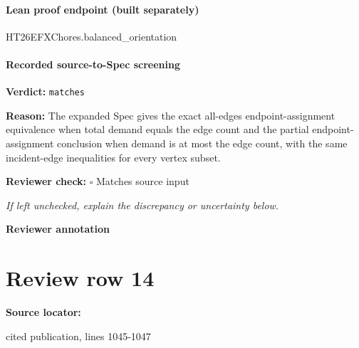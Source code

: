 \documentclass[10pt]{article}
\newcommand{\reviewerbox}{%
  \par\noindent\fbox{\parbox{0.96\linewidth}{\rule{0pt}{0.38in}}}\par
}
\newcommand{\reviewmatch}[1]{%
  \par\noindent\textbf{Reviewer check:} $\square$\; #1\par
  \noindent\emph{If left unchecked, explain the discrepancy or uncertainty below.}\par
}
\begin{document}
\paragraph{Lean proof endpoint (built separately)}\begin{ReviewVerbatim}
HT26EFXChores.balanced_orientation
\end{ReviewVerbatim}

\paragraph{Recorded source-to-Spec screening}
\textbf{Verdict:} \texttt{matches}
\\
{\raggedright
\textbf{Reason:} The expanded Spec gives the exact all-\allowbreak{}edges endpoint-\allowbreak{}assignment equivalence when total demand equals the edge count and the partial endpoint-\allowbreak{}assignment conclusion when demand is at most the edge count, with the same incident-\allowbreak{}edge inequalities for every vertex subset.\allowbreak{}
\par}
\reviewmatch{Matches source input}
\noindent\textbf{Reviewer annotation}\par
\reviewerbox
\clearpage
\hypertarget{source-claim-6263bf063357fb29}{}
\section*{Review row 14}
\textbf{Source locator:} {\footnotesize\raggedright cited publication, lines 1045-\allowbreak{}1047\par}
\end{document}
